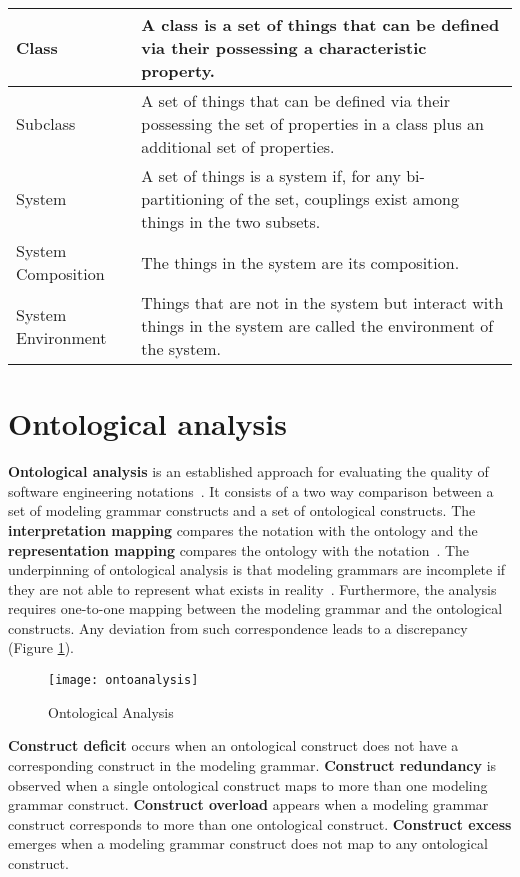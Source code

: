 \documentclass[parskip=full]{uvamscse}
\begin{document}
\begin{center}
\begin{longtable}{ | p{11em} | p{30em} | }
 \hline
 Class & A class is a set of things that can be defined via their possessing a characteristic property.~\cite{weber1996analytical} \\ 
 \hline
 Subclass & A set of things that can be defined via their possessing the set of properties in
a class plus an additional set of properties.~\cite{weber1996analytical} \\ 
\hline
 System & A set of things is a system if, for any bi-partitioning of the set, couplings exist among things in the two subsets.~\cite{wand1995deep} \\
 \hline
 System Composition & The things in the system are its composition.~\cite{wand1995deep} \\
 \hline
 System Environment &  Things that are not in the system but interact with things in the system are called the environment of the system.~\cite{wand1995deep} \\
 \hline
\end{longtable}
\end{center}


\section{Ontological analysis}

\textbf{Ontological analysis} is an established approach for evaluating the quality of software engineering notations~\cite{moody2009physics}. It consists of a two way comparison between a set of modeling grammar constructs and a set of ontological constructs. The \textbf{interpretation mapping} compares the notation with the ontology and the \textbf{representation mapping} compares the ontology with the notation~\cite{gehlert2007toward}. The underpinning of ontological analysis is that modeling grammars are incomplete if they are not able to represent what exists in reality~\cite{green2000integrated}. Furthermore, the analysis requires one-to-one mapping between the modeling grammar and the ontological constructs. Any deviation from such correspondence leads to a discrepancy (Figure \ref{fig:ontoanalysis}).

\begin{figure}[h!]
  \centering
  \caption{Ontological Analysis~\cite{gehlert2007toward}}
  \label{fig:ontoanalysis}
  \texttt{[image: ontoanalysis]}
\end{figure}

\textbf{Construct deficit} occurs when an ontological construct does not have a corresponding construct in the modeling grammar. \textbf{Construct redundancy} is observed when a single ontological construct maps to more than one modeling grammar construct. \textbf{Construct overload} appears when a modeling grammar construct corresponds to more than one ontological construct. \textbf{Construct excess} emerges when a modeling grammar construct does not map to any ontological construct.~\cite{moody2009physics}
\end{document}
